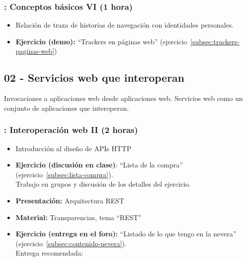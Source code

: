 \documentclass[a4paper,12pt]{article}
\begin{document}
\subsubsection{\martesG: Conceptos básicos VI (1 hora)}
\label{cal:martesG}

\begin{itemize}
\item Relación de traza de historias de navegación con identidades personales.
\item \textbf{Ejercicio (demo):} ``Trackers en páginas web'' (ejercicio~\ref{subsec:trackers-paginas-web})
\end{itemize}


\subsection{02 - Servicios web que interoperan}

Invocaciones a aplicaciones web desde aplicaciones web. Servicios web como un conjunto de aplicaciones que interoperan.
\subsubsection{\martesH: Interoperación web II (2 horas)}
\label{cal:martesH}

\begin{itemize}
\item Introducción al diseño de APIs HTTP
\item \textbf{Ejercicio (discusión en clase)}: ``Lista de la compra'' (ejercicio~\ref{subsec:lista-compra}). \\
  Trabajo en grupos y discusión de los detalles del ejercicio.
\item \textbf{Presentación:} Arquitectura REST
\item \textbf{Material:} Transparencias, tema ``REST''
\item \textbf{Ejercicio (entrega en el foro):} ``Listado de lo que tengo en la nevera'' (ejercicio~\ref{subsec:contenido-nevera}). \\
  Entrega recomendada: \martesI
\end{itemize}
\end{document}
